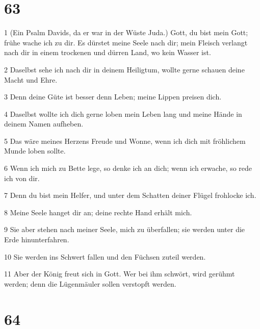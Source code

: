 \chapter{63}

\par 1 (Ein Psalm Davids, da er war in der Wüste Juda.) Gott, du bist mein Gott; frühe wache ich zu dir. Es dürstet meine Seele nach dir; mein Fleisch verlangt nach dir in einem trockenen und dürren Land, wo kein Wasser ist.
\par 2 Daselbst sehe ich nach dir in deinem Heiligtum, wollte gerne schauen deine Macht und Ehre.
\par 3 Denn deine Güte ist besser denn Leben; meine Lippen preisen dich.
\par 4 Daselbst wollte ich dich gerne loben mein Leben lang und meine Hände in deinem Namen aufheben.
\par 5 Das wäre meines Herzens Freude und Wonne, wenn ich dich mit fröhlichem Munde loben sollte.
\par 6 Wenn ich mich zu Bette lege, so denke ich an dich; wenn ich erwache, so rede ich von dir.
\par 7 Denn du bist mein Helfer, und unter dem Schatten deiner Flügel frohlocke ich.
\par 8 Meine Seele hanget dir an; deine rechte Hand erhält mich.
\par 9 Sie aber stehen nach meiner Seele, mich zu überfallen; sie werden unter die Erde hinunterfahren.
\par 10 Sie werden ins Schwert fallen und den Füchsen zuteil werden.
\par 11 Aber der König freut sich in Gott. Wer bei ihm schwört, wird gerühmt werden; denn die Lügenmäuler sollen verstopft werden.

\chapter{64}


